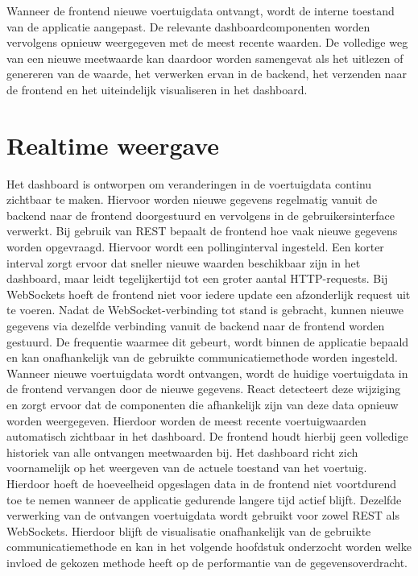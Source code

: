 Wanneer de frontend nieuwe voertuigdata ontvangt, wordt de interne toestand van de applicatie aangepast. De relevante dashboardcomponenten worden vervolgens opnieuw weergegeven met de meest recente waarden.
De volledige weg van een nieuwe meetwaarde kan daardoor worden samengevat als het uitlezen of genereren van de waarde, het verwerken ervan in de backend, het verzenden naar de frontend en het uiteindelijk visualiseren in het dashboard.

\section{Realtime weergave}
Het dashboard is ontworpen om veranderingen in de voertuigdata continu zichtbaar te maken. Hiervoor worden nieuwe gegevens regelmatig vanuit de backend naar de frontend doorgestuurd en vervolgens in de gebruikersinterface verwerkt.
Bij gebruik van REST bepaalt de frontend hoe vaak nieuwe gegevens worden opgevraagd. Hiervoor wordt een pollinginterval ingesteld. Een korter interval zorgt ervoor dat sneller nieuwe waarden beschikbaar zijn in het dashboard, maar leidt tegelijkertijd tot een groter aantal HTTP-requests.
Bij WebSockets hoeft de frontend niet voor iedere update een afzonderlijk request uit te voeren. Nadat de WebSocket-verbinding tot stand is gebracht, kunnen nieuwe gegevens via dezelfde verbinding vanuit de backend naar de frontend worden gestuurd. De frequentie waarmee dit gebeurt, wordt binnen de applicatie bepaald en kan onafhankelijk van de gebruikte communicatiemethode worden ingesteld.
Wanneer nieuwe voertuigdata wordt ontvangen, wordt de huidige voertuigdata in de frontend vervangen door de nieuwe gegevens. React detecteert deze wijziging en zorgt ervoor dat de componenten die afhankelijk zijn van deze data opnieuw worden weergegeven. Hierdoor worden de meest recente voertuigwaarden automatisch zichtbaar in het dashboard.
De frontend houdt hierbij geen volledige historiek van alle ontvangen meetwaarden bij. Het dashboard richt zich voornamelijk op het weergeven van de actuele toestand van het voertuig. Hierdoor hoeft de hoeveelheid opgeslagen data in de frontend niet voortdurend toe te nemen wanneer de applicatie gedurende langere tijd actief blijft.
Dezelfde verwerking van de ontvangen voertuigdata wordt gebruikt voor zowel REST als WebSockets. Hierdoor blijft de visualisatie onafhankelijk van de gebruikte communicatiemethode en kan in het volgende hoofdstuk onderzocht worden welke invloed de gekozen methode heeft op de performantie van de gegevensoverdracht.

